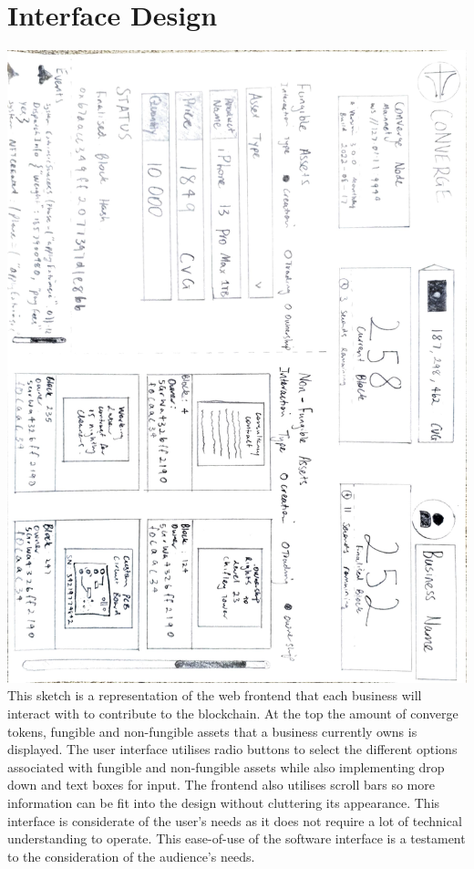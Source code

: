 \let\textcircled=\pgftextcircled
\chapter{Interface Design}

\includegraphics[width=\linewidth]{figures/ui.png} \\

This sketch is a representation of the web frontend that each business will interact with to contribute to the blockchain. At the top the amount of converge tokens, fungible and non-fungible assets that a business currently owns is displayed. The user interface utilises radio buttons to select the different options associated with fungible and non-fungible assets while also implementing drop down and text boxes for input. The frontend also utilises scroll bars so more information can be fit into the design without cluttering its appearance. This interface is considerate of the user’s needs as it does not require a lot of technical understanding to operate. This ease-of-use of the software interface is a testament to the consideration of the audience’s needs.
